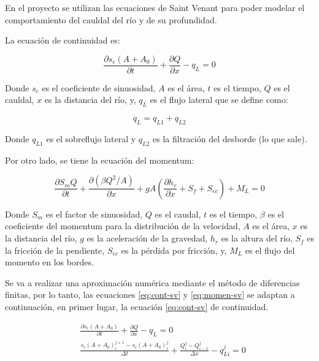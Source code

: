 \documentclass{article}
\begin{document}
En el proyecto se utilizan las ecuaciones de Saint Venant para poder modelar el comportamiento del cauldal del río y de su profundidad.

La ecuación de continuidad es:

\begin{equation}
  \label{eq:cont-sv}
  \frac{\partial s_{c} (A + A_{0})}{\partial t} + \frac{\partial Q}{\partial x} - q_{L} = 0
\end{equation}



Donde $s_{c}$ es el coeficiente de sinuosidad, $A$ es el área, $t$ es el tiempo, $Q$ es el cauldal, $x$ es la distancia del río, y, $q_{L}$ es el flujo lateral que se define como:

\[
q_{L} = q_{L1} + q_{L2}
\]

Donde $q_{L1}$ es el sobreflujo lateral y $q_{L2}$ es la filtración del desborde (lo que sale).

Por otro lado, se tiene la ecuación del momentum:

\begin{equation}
  \label{eq:momen-sv}
  \frac{\partial S_{m}Q}{\partial t} + \frac{\partial (\beta Q^{2} / A) }{\partial x} + g A \left(\frac{\partial h_{r}}{\partial x} + S_{f} + S_{ec}  \right) + M_{L} = 0 
\end{equation}



Donde $S_{m}$ es el factor de sinuosidad, $Q$ es el caudal, $t$ es el tiempo, $\beta$ es el coeficiente del momentum para la distribución de la velocidad, $A$ es el área, $x$ es la distancia del río, $g$ es la aceleración de la gravedad, $h_{r}$ es la altura del río, $S_{f}$ es la fricción de la pendiente, $S_{ec}$ es la pérdida por fricción, y, $M_{L}$ es el flujo del momento en los bordes.

Se va a realizar una aproximación numérica mediante el método de diferencias finitas, por lo tanto, las ecuaciones \ref{eq:cont-sv} y \ref{eq:momen-sv} se adaptan a continuación, en primer lugar, la ecuación \ref{eq:cont-sv} de continuidad.

\begin{align*}
  &\frac{\partial s_{c} (A + A_{0})}{\partial t} + \frac{\partial Q}{\partial x} - q_{L} = 0 \\
  &\frac{s_{c} (A + A_{0})_{i}^{j+1} - s_{c}(A + A_{0})_{i}^{j} }{\Delta t} + \frac{Q_{i}^{j} - Q_{i-1}^{j} }{\Delta x} - q_{Li}^{j} = 0   
\end{align*}
\end{document}
